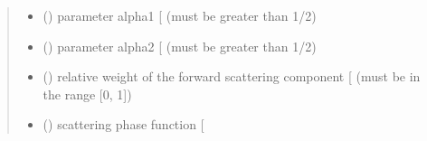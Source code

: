 \documentclass[letterpaper,10pt,english]{sphinxmanual}
\begin{document}
\begin{fulllineitems}
\begin{quote}
\begin{description}
\begin{itemize}
\item {} 
\sphinxAtStartPar
{} () \textendash{} parameter alpha1 {[}\sphinxhyphen{}{]} (must be greater than \sphinxhyphen{}1/2)

\item {} 
\sphinxAtStartPar
{} () \textendash{} parameter alpha2 {[}\sphinxhyphen{}{]} (must be greater than \sphinxhyphen{}1/2)

\item {} 
\sphinxAtStartPar
{} () \textendash{} relative weight of the forward scattering component {[}\sphinxhyphen{}{]} (must be in the range {[}0, 1{]})

\end{itemize}

\sphinxAtStartPar
\begin{itemize}
\item {} 
\sphinxAtStartPar
{} () \textendash{} scattering phase function {[}\sphinxhyphen{}{]}

\end{itemize}


\end{description}\end{quote}

\end{fulllineitems}

\end{document}
